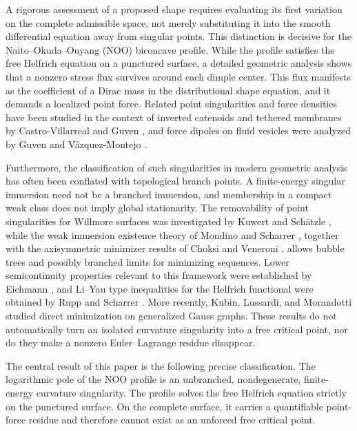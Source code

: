 \documentclass[preprint,amsmath,amssymb,aps,prl,superscriptaddress,nofootinbib,floatfix]{revtex4-2}
\begin{document}
A rigorous assessment of a proposed shape requires evaluating its first variation on the complete admissible space, not merely substituting it into the smooth differential equation away from singular points. This distinction is decisive for the Naito--Okuda--Ouyang (NOO) biconcave profile. While the profile satisfies the free Helfrich equation on a punctured surface, a detailed geometric analysis shows that a nonzero stress flux survives around each dimple center. This flux manifests as the coefficient of a Dirac mass in the distributional shape equation, and it demands a localized point force. Related point singularities and force densities have been studied in the context of inverted catenoids and tethered membranes by Castro-Villarreal and Guven \cite{CastroGuven2007}, and force dipoles on fluid vesicles were analyzed by Guven and V\'azquez-Montejo \cite{GuvenVazquez2013}.

Furthermore, the classification of such singularities in modern geometric analysis has often been conflated with topological branch points. A finite-energy singular immersion need not be a branched immersion, and membership in a compact weak class does not imply global stationarity. The removability of point singularities for Willmore surfaces was investigated by Kuwert and Sch\"atzle \cite{KuwertSchaetzle2004}, while the weak immersion existence theory of Mondino and Scharrer \cite{MondinoScharrer2020}, together with the axisymmetric minimizer results of Choksi and Veneroni \cite{ChoksiVeneroni2013}, allows bubble trees and possibly branched limits for minimizing sequences. Lower semicontinuity properties relevant to this framework were established by Eichmann \cite{Eichmann2020}, and Li--Yau type inequalities for the Helfrich functional were obtained by Rupp and Scharrer \cite{RuppScharrer2023}. More recently, Kubin, Lussardi, and Morandotti \cite{KubinLussardiMorandotti2024} studied direct minimization on generalized Gauss graphs. These results do not automatically turn an isolated curvature singularity into a free critical point, nor do they make a nonzero Euler--Lagrange residue disappear.

The central result of this paper is the following precise classification. The logarithmic pole of the NOO profile is an unbranched, nondegenerate, finite-energy curvature singularity. The profile solves the free Helfrich equation strictly on the punctured surface. On the complete surface, it carries a quantifiable point-force residue and therefore cannot exist as an unforced free critical point.
\end{document}
